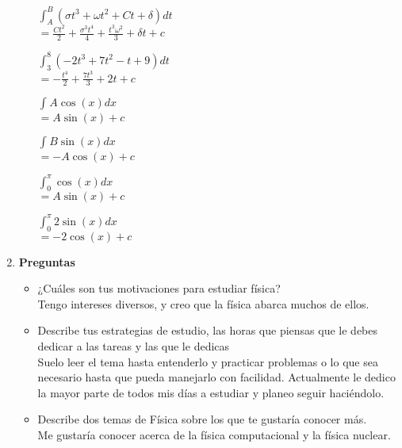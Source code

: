 \documentclass[10pt, a4paper]{article}
\begin{document}
\begin{enumerate}
\begin{itemize}
\begin{center}
                    $\int_{A}^{B}(\sigma t^3+\omega t^2 + Ct + \delta)dt$\\
                    $=\frac{Ct^2}{2}+\frac{\sigma^3t^4}{4}+\frac{t^3\omega^2}{3}+\delta t + c$

                    $\int_{3}^{8}(-2t^3+7t^2-t+9)dt$\\
                    $=-\frac{t^4}{2}+\frac{7t^3}{3}+2t+c$

                    $\int_{}^{}A\cos(x)dx$\\
                    $=A\sin(x) + c$

                    $\int_{}^{}B\sin(x)dx$\\
                    $=-A\cos(x) + c$

                    $\int_{0}^{\pi}\cos(x)dx$\\
                    $=A\sin(x) + c$

                    $\int_{0}^{\pi}2\sin(x)dx$\\
                    $=-2\cos(x) + c$
                \end{center}
            \end{itemize}
            
        \item \textbf{Preguntas}
            \begin{itemize}   
                \item ¿Cuáles son tus motivaciones para estudiar física?\\
                Tengo intereses diversos, y creo que la física abarca muchos de ellos.

                \item Describe tus estrategias de estudio, las horas que piensas que le debes dedicar a
                las tareas y las que le dedicas\\
                Suelo leer el tema hasta entenderlo y practicar problemas o lo que sea necesario hasta que
                pueda manejarlo con facilidad. Actualmente le dedico la mayor parte de todos mis días a estudiar
                y planeo seguir haciéndolo.

                \item Describe dos temas de Física sobre los que te gustaría conocer más.\\
                Me gustaría conocer acerca de la física computacional y la física nuclear.
            \end{itemize}
    \end{enumerate}
\end{document}
